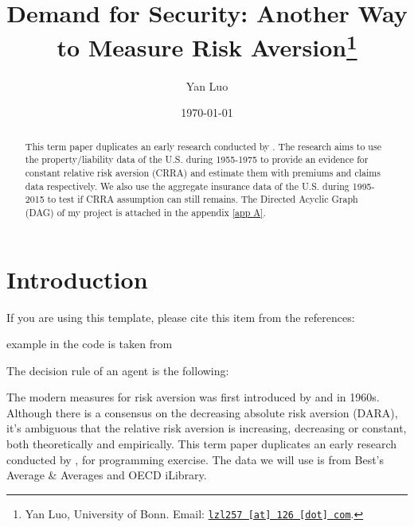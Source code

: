 \documentclass[11pt, a4paper, leqno]{article}
\begin{document}
\title{Demand for Security: Another Way to Measure Risk Aversion\thanks{Yan Luo, University of Bonn. Email: \href{mailto:lzl257@126.com}{\nolinkurl{lzl257 [at] 126 [dot] com}}.}}

\author{Yan Luo}

\date{
\today
}

\maketitle


\begin{abstract}
	This term paper duplicates an early research conducted by \citet{szpiro1986measuring}. The research aims to use the property/liability data of the U.S. during 1955-1975 to provide an evidence for constant relative risk aversion (CRRA) and estimate them with premiums and claims data respectively. We also use the aggregate insurance data of the U.S. during 1995-2015 to test if CRRA assumption can still remains. The Directed Acyclic Graph (DAG) of my project is attached in the appendix \ref{app A}.
\end{abstract}
\clearpage

\section{Introduction} %
\label{sec:introduction}

If you are using this template, please cite this item from the references: \citet{GaudeckerEconProjectTemplates}

\citet{Schelling69} example in the code is taken from \citet{StachurskiSargent13}

The decision rule of an agent is the following:


The modern measures for risk aversion was first introduced by \citet{arrow1965aspects} and \citet{pratt1978risk} in 1960s. Although there is a consensus on the decreasing absolute risk aversion (DARA), it's ambiguous that the relative risk aversion is increasing, decreasing or constant, both theoretically and empirically. This term paper duplicates an early research conducted by \citet{szpiro1986measuring}, for programming exercise. The data we will use is from Best's Average \& Averages and OECD iLibrary.
\end{document}
